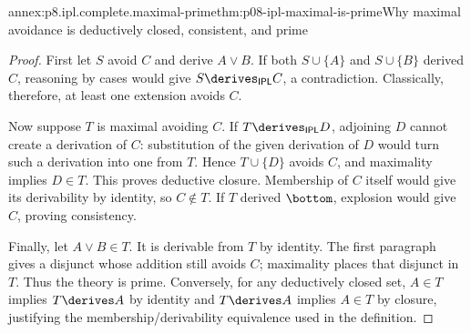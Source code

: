 \begin{annexitem}{annex:p8.ipl.complete.maximal-prime}{thm:p08-ipl-maximal-is-prime}{Why maximal avoidance is deductively closed, consistent, and prime}
\begin{proof}
First let \(S\) avoid \(C\) and derive \(A\lor B\). If both
\(S\cup\{A\}\) and \(S\cup\{B\}\) derived \(C\), reasoning
by cases would give \(S\derives_{\mathsf{IPL}}C\), a contradiction.
Classically, therefore, at least one extension avoids \(C\).

Now suppose \(T\) is maximal avoiding \(C\). If
\(T\derives_{\mathsf{IPL}}D\), adjoining \(D\) cannot create a
derivation of \(C\): substitution of the given derivation of \(D\)
would turn such a derivation into one from \(T\). Hence
\(T\cup\{D\}\) avoids \(C\), and maximality implies \(D\in T\).
This proves deductive closure. Membership of \(C\) itself would give
its derivability by identity, so \(C\notin T\). If \(T\) derived
\(\bottom\), explosion would give \(C\), proving consistency.

Finally, let \(A\lor B\in T\). It is derivable from \(T\) by
identity. The first paragraph gives a disjunct whose addition still
avoids \(C\); maximality places that disjunct in \(T\). Thus the
theory is prime. Conversely, for any deductively closed set,
\(A\in T\) implies \(T\derives A\) by identity and
\(T\derives A\) implies \(A\in T\) by closure, justifying the
membership/derivability equivalence used in the definition.
\end{proof}
\end{annexitem}

